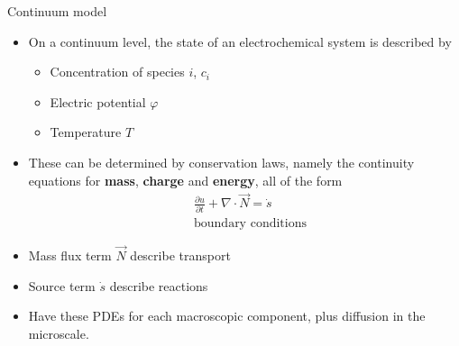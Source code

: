 \documentclass{beamer}
\begin{document}
\begin{frame}{Continuum model}

  \begin{itemize}
  \item On a continuum level, the state of an electrochemical system is described by
    \begin{itemize}
    \item Concentration of species $i$, $c_i$
    \item Electric potential $\varphi$
    \item Temperature $T$
    \end{itemize}
  \item These can be determined by conservation laws, namely the
    continuity equations for {\bf mass}, {\bf charge} and {\bf energy},
    all of the form
    \begin{align*}
  &    \frac{\partial u}{\partial t} + \nabla \cdot \vec{N} = \dot{s} \\
   &   \text{boundary conditions}
    \end{align*}
  \item Mass flux term $\vec{N}$ describe transport %
  \item Source term $\dot{s}$ describe reactions %
  \item Have these PDEs for each macroscopic component, plus diffusion in the microscale.
  \end{itemize}

\end{frame}

\end{document}
